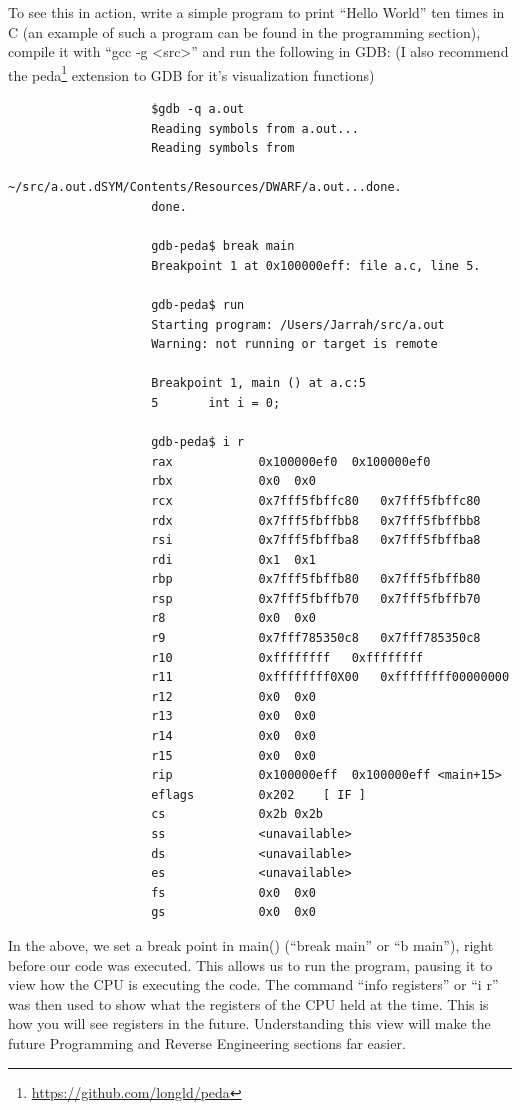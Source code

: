 \documentclass[a4paper,11pt]{report}
\begin{document}
				To see this in action, write a simple program to print ``Hello World'' ten times in C (an example of such a program can be found in the programming section), %
				compile it with ``gcc -g <src>'' and run the following in GDB: (I also recommend the peda\footnote{\url{https://github.com/longld/peda}} extension to GDB for it's visualization functions)				
				\begin{verbatim}
					$gdb -q a.out
					Reading symbols from a.out...
					Reading symbols from 
					~/src/a.out.dSYM/Contents/Resources/DWARF/a.out...done.
					done.

					gdb-peda$ break main
					Breakpoint 1 at 0x100000eff: file a.c, line 5.

					gdb-peda$ run
					Starting program: /Users/Jarrah/src/a.out
					Warning: not running or target is remote

					Breakpoint 1, main () at a.c:5
					5		int i = 0;

					gdb-peda$ i r
					rax            0x100000ef0	0x100000ef0
					rbx            0x0	0x0
					rcx            0x7fff5fbffc80	0x7fff5fbffc80
					rdx            0x7fff5fbffbb8	0x7fff5fbffbb8
					rsi            0x7fff5fbffba8	0x7fff5fbffba8
					rdi            0x1	0x1
					rbp            0x7fff5fbffb80	0x7fff5fbffb80
					rsp            0x7fff5fbffb70	0x7fff5fbffb70
					r8             0x0	0x0
					r9             0x7fff785350c8	0x7fff785350c8
					r10            0xffffffff	0xffffffff
					r11            0xffffffff0X00	0xffffffff00000000
					r12            0x0	0x0
					r13            0x0	0x0
					r14            0x0	0x0
					r15            0x0	0x0
					rip            0x100000eff	0x100000eff <main+15>
					eflags         0x202	[ IF ]
					cs             0x2b	0x2b
					ss             <unavailable>
					ds             <unavailable>
					es             <unavailable>
					fs             0x0	0x0
					gs             0x0	0x0

				\end{verbatim}
				In the above, we set a break point in main() (``break main'' or ``b main''), right before our code was executed. 
				This allows us to run the program, pausing it to view how the CPU is executing the code. 
				The command ``info registers'' or ``i r'' was then used to show what the registers of the CPU held at the time.
				This is how you will see registers in the future. 
				Understanding this view will make the future Programming and Reverse Engineering sections far easier. %
\end{document}
